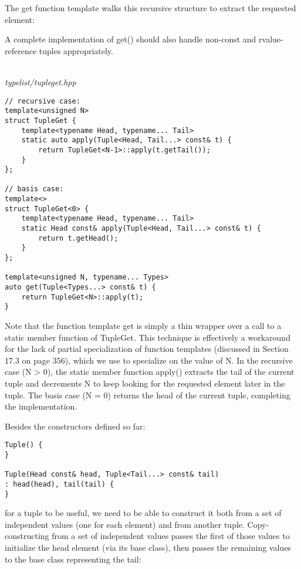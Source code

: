 The get function template walks this recursive structure to extract the requested element:

\begin{tcolorbox}[colback=webgreen!5!white,colframe=webgreen!75!black]
\hspace*{0.75cm}A complete implementation of get() should also handle non-const and rvalue-reference tuples appropriately.
\end{tcolorbox}

\hspace*{\fill} \\ %
\noindent
\textit{typelist/tupleget.hpp}
\begin{lstlisting}[style=styleCXX]
// recursive case:
template<unsigned N>
struct TupleGet {
	template<typename Head, typename... Tail>
	static auto apply(Tuple<Head, Tail...> const& t) {
		return TupleGet<N-1>::apply(t.getTail());
	}
};

// basis case:
template<>
struct TupleGet<0> {
	template<typename Head, typename... Tail>
	static Head const& apply(Tuple<Head, Tail...> const& t) {
		return t.getHead();
	}
};

template<unsigned N, typename... Types>
auto get(Tuple<Types...> const& t) {
	return TupleGet<N>::apply(t);
}
\end{lstlisting}

Note that the function template get is simply a thin wrapper over a call to a static member function of TupleGet. This technique is effectively a workaround for the lack of partial specialization of function templates (discussed in Section 17.3 on page 356), which we use to specialize on the value of N. In the recursive case (N > 0), the static member function apply() extracts the tail of the current tuple and decrements N to keep looking for the requested element later in the tuple. The basis case (N = 0) returns the head of the current tuple, completing the implementation.


Besides the constructors defined so far:

\begin{lstlisting}[style=styleCXX]
Tuple() {
}

Tuple(Head const& head, Tuple<Tail...> const& tail)
: head(head), tail(tail) {
}
\end{lstlisting}

for a tuple to be useful, we need to be able to construct it both from a set of independent values (one for each element) and from another tuple. Copy-constructing from a set of independent values passes the first of those values to initialize the head element (via its base class), then passes the remaining values to the base class representing the tail:

